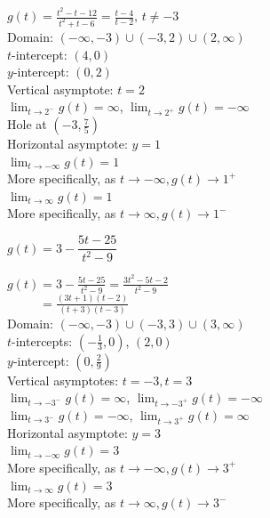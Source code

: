 \documentclass{ximera}
\begin{document}
\begin{question}
\begin{problem}
\begin{solution}
$g(t) = \frac{t^2-t-12}{t^{2} +t - 6} = \frac{t-4}{t - 2}, \, t \neq -3$\\
Domain: $(-\infty, -3) \cup (-3, 2) \cup (2, \infty)$\\
$t$-intercept:  $(4,0)$\\
$y$-intercept:  $(0,2)$\\
Vertical asymptote: $t = 2$\\
$\lim_{t \rightarrow 2^{-}} g(t) = \infty$, $\lim_{t \rightarrow 2^{+}} g(t) = -\infty$ \\
Hole at $\left(-3, \frac{7}{5} \right)$ \\
Horizontal asymptote: $y = 1$ \\
$\lim_{t \rightarrow  -\infty} g(t) = 1$\\
More specifically, as $t \rightarrow -\infty, g(t) \rightarrow 1^{+}$\\
$\lim_{t \rightarrow  \infty} g(t) = 1$\\
More specifically, as $t \rightarrow \infty, g(t) \rightarrow 1^{-}$\\

\begin{center} 
\end{center}
\end{solution}
\end{problem} 

\begin{problem}
$g(t) = 3- \dfrac{5t-25}{t^2-9}$

\begin{solution}
$g(t) = 3- \frac{5t-25}{t^2-9} = \frac{3t^2-5t-2}{t^{2} -9}$\\
 $\phantom{g(t)}= \frac{(3t+1)(t-2)}{(t + 3)(t - 3)}$\\
Domain: $(-\infty, -3) \cup (-3, 3) \cup (3, \infty)$\\
$t$-intercepts: $\left(-\frac{1}{3}, 0 \right)$, $(2,0)$\\
$y$-intercept:  $\left(0, \frac{2}{9} \right)$\\
Vertical asymptotes: $t = -3, t = 3$\\
$\lim_{t \rightarrow -3^{-}} g(t) = \infty$, $\lim_{t \rightarrow -3^{+}} g(t) = -\infty$ \\
$\lim_{t \rightarrow 3^{-}} g(t) = -\infty$, $\lim_{t \rightarrow 3^{+}} g(t) = \infty$ \\
Horizontal asymptote: $y = 3$ \\
$\lim_{t \rightarrow -\infty} g(t) = 3$\\
More specifically, as $t \rightarrow -\infty, g(t) \rightarrow 3^{+}$\\
$\lim_{t \rightarrow \infty} g(t) = 3$\\
More specifically, as $t \rightarrow \infty, g(t) \rightarrow 3^{-}$\\


\end{solution}
\end{problem}
\end{question}
\end{document}
